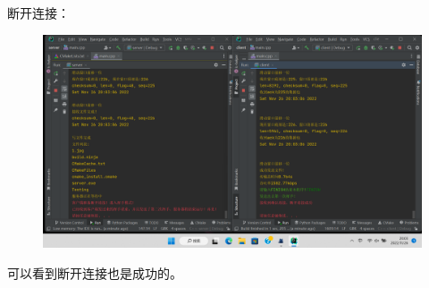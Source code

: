 \documentclass[UTF8,a4paper,10pt]{ctexart}
\begin{document}
断开连接：
\begin{figure}[H]
    \centering
    \includegraphics[scale=0.4]{G网3.png}
    \label{fig:8}
\end{figure}
可以看到断开连接也是成功的。
\end{document}
